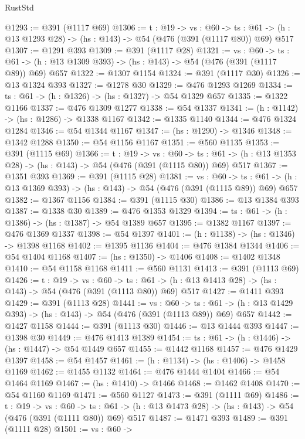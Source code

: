 \begin{lexlean}{RustStd}
\begin{coremodule}
@1293 := @391 (@1117 @69)
@1306 := {t : @19} ->
  {vs : @60} ->
  {ts : @61} -> (h : @13 @1293 @28) -> (hs : @143) -> @54 (@476 (@391 (@1117 @80)) @69) @517
@1307 := @1291 @393
@1309 := @391 (@1117 @28)
@1321 := {vs : @60} ->
  {ts : @61} -> (h : @13 @1309 @393) -> (hs : @143) -> @54 (@476 (@391 (@1117 @89)) @69) @657
@1322 := @1307 @1154
@1324 := @391 (@1117 @30)
@1326 := @13 @1324 @393
@1327 := @1278 @30
@1329 := @476 @1293 @1269
@1334 := {ts : @61} -> (h : @1326) -> (hs : @1327) -> @54 @1329 @657
@1335 := @1322 @1166
@1337 := @476 @1309 @1277
@1338 := @54 @1337
@1341 := (h : @1142) -> (hs : @1286) -> @1338 @1167
@1342 := @1335 @1140
@1344 := @476 @1324 @1284
@1346 := @54 @1344 @1167
@1347 := (hs : @1290) -> @1346
@1348 := @1342 @1288
@1350 := @54 @1156 @1167
@1351 := @560 @1135
@1353 := @391 (@1115 @69)
@1366 := {t : @19} ->
  {vs : @60} ->
  {ts : @61} -> (h : @13 @1353 @28) -> (hs : @143) -> @54 (@476 (@391 (@1115 @80)) @69) @517
@1367 := @1351 @393
@1369 := @391 (@1115 @28)
@1381 := {vs : @60} ->
  {ts : @61} -> (h : @13 @1369 @393) -> (hs : @143) -> @54 (@476 (@391 (@1115 @89)) @69) @657
@1382 := @1367 @1156
@1384 := @391 (@1115 @30)
@1386 := @13 @1384 @393
@1387 := @1338 @30
@1389 := @476 @1353 @1329
@1394 := {ts : @61} -> (h : @1386) -> (hs : @1387) -> @54 @1389 @657
@1395 := @1382 @1167
@1397 := @476 @1369 @1337
@1398 := @54 @1397
@1401 := (h : @1138) -> (hs : @1346) -> @1398 @1168
@1402 := @1395 @1136
@1404 := @476 @1384 @1344
@1406 := @54 @1404 @1168
@1407 := (hs : @1350) -> @1406
@1408 := @1402 @1348
@1410 := @54 @1158 @1168
@1411 := @560 @1131
@1413 := @391 (@1113 @69)
@1426 := {t : @19} ->
  {vs : @60} ->
  {ts : @61} -> (h : @13 @1413 @28) -> (hs : @143) -> @54 (@476 (@391 (@1113 @80)) @69) @517
@1427 := @1411 @393
@1429 := @391 (@1113 @28)
@1441 := {vs : @60} ->
  {ts : @61} -> (h : @13 @1429 @393) -> (hs : @143) -> @54 (@476 (@391 (@1113 @89)) @69) @657
@1442 := @1427 @1158
@1444 := @391 (@1113 @30)
@1446 := @13 @1444 @393
@1447 := @1398 @30
@1449 := @476 @1413 @1389
@1454 := {ts : @61} -> (h : @1446) -> (hs : @1447) -> @54 @1449 @657
@1455 := @1442 @1168
@1457 := @476 @1429 @1397
@1458 := @54 @1457
@1461 := (h : @1134) -> (hs : @1406) -> @1458 @1169
@1462 := @1455 @1132
@1464 := @476 @1444 @1404
@1466 := @54 @1464 @1169
@1467 := (hs : @1410) -> @1466
@1468 := @1462 @1408
@1470 := @54 @1160 @1169
@1471 := @560 @1127
@1473 := @391 (@1111 @69)
@1486 := {t : @19} ->
  {vs : @60} ->
  {ts : @61} -> (h : @13 @1473 @28) -> (hs : @143) -> @54 (@476 (@391 (@1111 @80)) @69) @517
@1487 := @1471 @393
@1489 := @391 (@1111 @28)
@1501 := {vs : @60} ->

\end{coremodule}
\end{lexlean}
